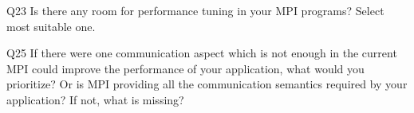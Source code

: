 \begin{description}%
\item{Q23} Is there any room for performance tuning in your MPI programs? Select most suitable one.%
\item{Q25} If there were one communication aspect which is not enough in the current MPI could improve the performance of your application, what would you prioritize? Or is MPI providing all the communication semantics required by your application? If not, what is missing?%
\end{description}%
